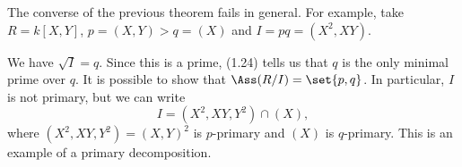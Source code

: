The converse of the previous theorem fails in general. For example,
take
$R = k[X, Y]$, $p = (X, Y) > q = (X)$ and $I = pq = (X^2, XY)$.

We have $\sqrt{I} = q$. Since this is a prime, (1.24) tells us that $q$ is the
only minimal prime over $q$. It is possible to show that $\Ass(R/I) = \set{p, q}$.
In particular, $I$ is not primary, but we can write
\[ I = (X^2, XY, Y^2) \cap (X), \]
where $(X^2, XY, Y^2) = (X, Y)^2$ is $p$-primary and $(X)$ is $q$-primary.
This is an example of a primary decomposition.

